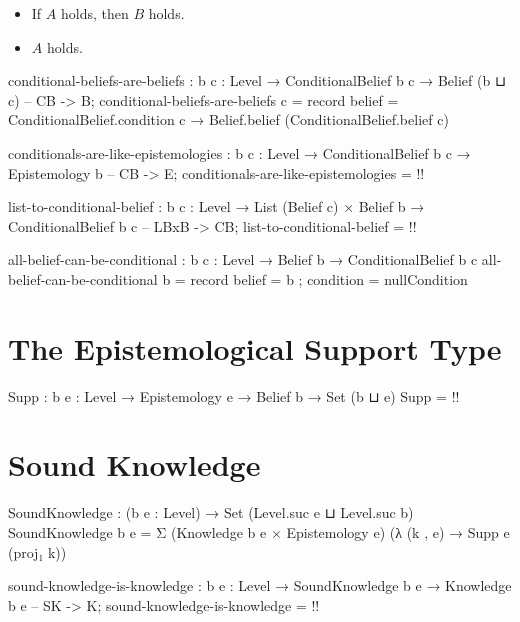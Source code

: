 \documentclass{article}
\begin{document}
\begin{itemize}
  \item If \(A\) holds, then \(B\) holds.
  \item \(A\) holds.
\end{itemize}

\begin{code}
conditional-beliefs-are-beliefs :
  {b c : Level} → ConditionalBelief b c → Belief (b ⊔ c) -- CB -> B;
conditional-beliefs-are-beliefs c = record
  { belief = ConditionalBelief.condition c → Belief.belief (ConditionalBelief.belief c)
  }
\end{code}

\begin{code}
conditionals-are-like-epistemologies :
  {b c : Level} → ConditionalBelief b c → Epistemology b -- CB -> E;
conditionals-are-like-epistemologies = {!!}
\end{code}

\begin{code}
list-to-conditional-belief :
  {b c : Level} →
  List (Belief c) × Belief b →
  ConditionalBelief b c -- LBxB -> CB;
list-to-conditional-belief = {!!}
\end{code}

\begin{code}
all-belief-can-be-conditional : {b c : Level} → Belief b → ConditionalBelief b c
all-belief-can-be-conditional b = record
  { belief = b
  ; condition = nullCondition
  }
\end{code}

\section{The Epistemological Support Type}

\begin{code}
Supp : {b e : Level} → Epistemology e → Belief b → Set (b ⊔ e)
Supp = {!!}
\end{code}

\section{Sound Knowledge}

\begin{code}
SoundKnowledge : (b e : Level) → Set (Level.suc e ⊔ Level.suc b)
SoundKnowledge b e =
  Σ (Knowledge b e × Epistemology e)
    (λ (k , e) → Supp e (proj₁ k))
\end{code}

\begin{code}
sound-knowledge-is-knowledge :
  {b e : Level} → SoundKnowledge b e → Knowledge b e -- SK -> K;
sound-knowledge-is-knowledge = {!!}
\end{code}
\end{document}

